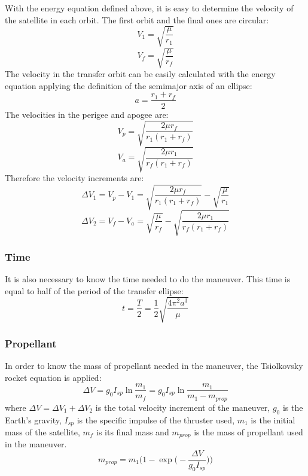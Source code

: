 With the energy equation defined above, it is easy to determine the velocity of the satellite in each orbit. The first orbit and the final ones are circular:
\begin{equation}
V_{1}=\sqrt{\frac{\mu}{r_{1}}}
\end{equation}
\begin{equation}
V_{f}=\sqrt{\frac{\mu}{r_{f}}}
\end{equation}
The velocity in the transfer orbit can be easily calculated with the energy equation applying the definition of the semimajor axis of an ellipse:
\begin{equation}
a=\frac{r_{1}+r_{f}}{2}
\end{equation}
The velocities in the perigee and apogee are:
\begin{equation}
V_{p}=\sqrt{\frac{2\mu r_{f}}{r_{1}(r_{1}+r_{f})}}
\end{equation}
\begin{equation}
V_{a}=\sqrt{\frac{2\mu r_{1}}{r_{f}(r_{1}+r_{f})}}
\end{equation}
Therefore the velocity increments are:
\begin{equation}
\Delta V_{1}=V_{p}-V_{1}=\sqrt{\frac{2\mu r_{f}}{r_{1}(r_{1}+r_{f})}}-\sqrt{\frac{\mu}{r_{1}}}
\end{equation}
\begin{equation}
\Delta V_{2}=V_{f}-V_{a}=\sqrt{\frac{\mu}{r_{f}}}-\sqrt{\frac{2\mu r_{1}}{r_{f}(r_{1}+r_{f})}}
\end{equation}

\subsubsection{Time}
It is also necessary to know the time needed to do the maneuver. This time is equal to half of the period of the transfer ellipse:
\begin{equation}
t=\frac{T}{2}=\frac{1}{2}\sqrt{\frac{4\pi^{2}a^{3}}{\mu}}
\end{equation}

\subsubsection{Propellant}
In order to know the mass of propellant needed in the maneuver, the Tsiolkovsky rocket equation is applied:
\begin{equation}
\Delta V=g_{0}I_{sp}\ln{\frac{m_{1}}{m_{f}}}=g_{0}I_{sp}\ln{\frac{m_{1}}{m_{1}-m_{prop}}}
\end{equation}
where $\Delta V=\Delta V_{1}+\Delta V_{2}$ is the total velocity increment of the maneuver, $g_{0}$ is the Earth's gravity, $I_{sp}$ is the specific impulse of the thruster used, $m_{1}$ is the initial mass of the satellite, $m_{f}$ is its final mass and $m_{prop}$ is the mass of propellant used in the maneuver.
\begin{equation}
m_{prop}=m_{1}\Bigg(1-\exp\bigg(-\frac{\Delta V}{g_{0}I_{sp}}\bigg)\Bigg)
\end{equation}

